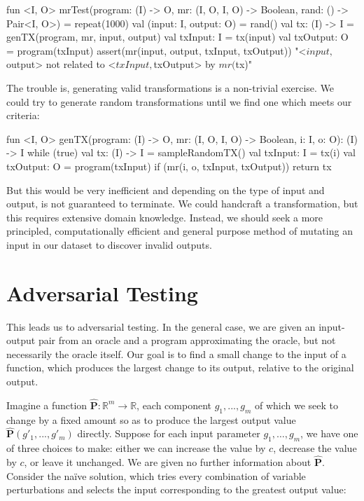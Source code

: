\begin{kotlinlisting}
fun <I, O> mrTest(program: (I) -> O, mr: (I, O, I, O) -> Boolean, rand: () -> Pair<I, O>) =
    repeat(1000) {
        val (input: I, output: O) = rand()
        val tx: (I) -> I = genTX(program, mr, input, output)
        val txInput: I = tx(input)
        val txOutput: O = program(txInput)
        assert(mr(input, output, txInput, txOutput)) {
            "<$input, $output> not related to <$txInput, $txOutput> by $mr ($tx)"
        }
    }
\end{kotlinlisting}
%
The trouble is, generating valid transformations is a non-trivial exercise. We could try to generate random transformations until we find one which meets our criteria:
%
\begin{kotlinlisting}
fun <I, O> genTX(program: (I) -> O, mr: (I, O, I, O) -> Boolean, i: I, o: O): (I) -> I {
    while (true) {
        val tx: (I) -> I = sampleRandomTX()
        val txInput: I = tx(i)
        val txOutput: O = program(txInput)
        if (mr(i, o, txInput, txOutput)) return tx
    }
}
\end{kotlinlisting}

But this would be very inefficient and depending on the type of input and output, is not guaranteed to terminate. We could handcraft a transformation, but this requires extensive domain knowledge. Instead, we should seek a more principled, computationally efficient and general purpose method of mutating an input in our dataset to discover invalid outputs.

\section{Adversarial Testing}

This leads us to adversarial testing. In the general case, we are given an input-output pair from an oracle and a program approximating the oracle, but not necessarily the oracle itself. Our goal is to find a small change to the input of a function, which produces the largest change to its output, relative to the original output.

Imagine a function $\mathbf{\hat P}: \mathbb R^m \rightarrow \mathbb R$, each component $g_1, ..., g_{m}$ of which we seek to change by a fixed amount so as to produce the largest output value $\mathbf{\hat P}(g'_1, ..., g'_{m})$ directly. Suppose for each input parameter $g_1, \ldots, g_{m}$, we have one of three choices to make: either we can increase the value by $c$, decrease the value by $c$, or leave it unchanged. We are given no further information about $\mathbf{\hat P}$. Consider the na\"ive solution, which tries every combination of variable perturbations and selects the input corresponding to the greatest output value:

